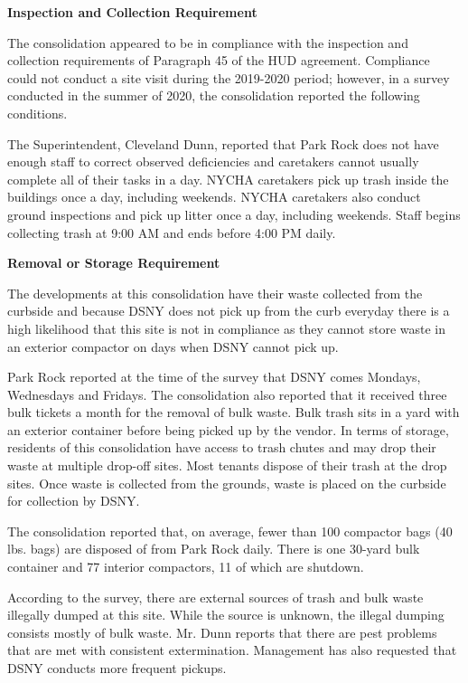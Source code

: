 
\textbf{Inspection and Collection Requirement}

The consolidation appeared to be in compliance with the inspection and collection requirements of Paragraph 45 of the HUD agreement. Compliance could not conduct a site visit during the 2019-2020 period; however, in a survey conducted in the summer of 2020, the consolidation reported the following conditions.

The Superintendent, Cleveland Dunn, reported that Park Rock does not have enough staff to correct observed deficiencies and caretakers cannot usually complete all of their tasks in a day. NYCHA caretakers pick up trash inside the buildings once a day, including weekends. NYCHA caretakers also conduct ground inspections and pick up litter once a day, including weekends. Staff begins collecting trash at 9:00 AM and ends before 4:00 PM daily. 

\textbf{Removal or Storage Requirement}

The developments at this consolidation have their waste collected from the curbside and because DSNY does not pick up from the curb everyday there is a high likelihood that this site is not in compliance as they cannot store waste in an exterior compactor on days when DSNY cannot pick up.

Park Rock reported at the time of the survey that DSNY comes Mondays, Wednesdays and Fridays. The consolidation also reported that it received three bulk tickets a month for the removal of bulk waste. Bulk trash sits in a yard with an exterior container before being picked up by the vendor. In terms of storage, residents of this consolidation have access to trash chutes and may drop their waste at multiple drop-off sites. Most tenants dispose of their trash at the drop sites. Once waste is collected from the grounds, waste is placed on the curbside for collection by DSNY. 

The consolidation reported that, on average, fewer than 100 compactor bags (40 lbs. bags) are disposed of from Park Rock daily. There is one 30-yard bulk container and 77 interior compactors, 11 of which are shutdown.

According to the survey, there are external sources of trash and bulk waste illegally dumped at this site. While the source is unknown, the illegal dumping consists mostly of bulk waste. Mr. Dunn reports that there are pest problems that are met with consistent extermination. Management has also requested that DSNY conducts more frequent pickups. 